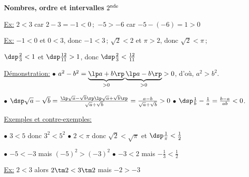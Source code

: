 \documentclass[12pt]{article}
\author{Y. Morel}
\date{}
\newcommand{\TITLE}{Nombres, ordre et intervalles}
\begin{document}
\hfill{\LARGE \bf \TITLE}
\hfill $2^{\mbox{\scriptsize{nde}}}$


\setcounter{section}{0}
 

 \ul{Ex:} $2<3$ car $2-3=-1<0$\,;\ $-5>-6$ car $-5-(-6)=1>0$
 

 \ul{Ex:} $-1<0$ et $0<3$, donc $-1<3$\,;
 $\sqrt{2}<2$ et $\pi>2$, donc $\sqrt{2}<\pi$\,;

 \vspd
 \hspace{0.8cm} $\dsp\frac{2}{3}<1$ et $\dsp\frac{12}{11}>1$, donc
            $\dsp\frac{2}{3}<\frac{12}{11}$ 
 

 
 \vspd
 \ul{Démonstration:}  
   $\bullet$
     $a^2-b^2=\underbrace{\lp a+b\rp}_{>0}\underbrace{\lp a-b\rp}_{>0}>0$, 
     d'où, $a^2>b^2$. 

     \vspd
   $\bullet$
     $\dsp\sqrt{a}-\sqrt{b}=\frac{\lp\sqrt{a}-\sqrt{b}\rp\lp\sqrt{a}+\sqrt{b}\rp}{\sqrt{a}+\sqrt{b}}=\frac{a-b}{\sqrt{a}+\sqrt{b}}>0$ 
     \hspace{0.3cm}$\bullet$ $\dsp\frac{1}{b}-\frac{1}{a}=\frac{b-a}{ab}<0$.
  
  \vspt
  \ul{Exemples et contre-exemples:}

  $\bullet$ $3<5$ donc $3^2<5^2$ \hspace{2.61cm}
  $\bullet$ $2<\pi$ donc $\sqrt{2}<\sqrt{\pi}$ et 
    $\dsp\frac{1}{\pi}<\frac{1}{2}$

  $\bullet$ $-5<-3$ mais $(-5)^2>(-3)^2$ \hspace{1cm} 
  $\bullet$ $-3<2$ mais $-\frac{1}{3}<\frac{1}{2}$



  
  \vspd
  \ul{Ex:} $2<3$ alors $2\tm 2<3\tm 2$ mais $-2>-3$
\end{document}
